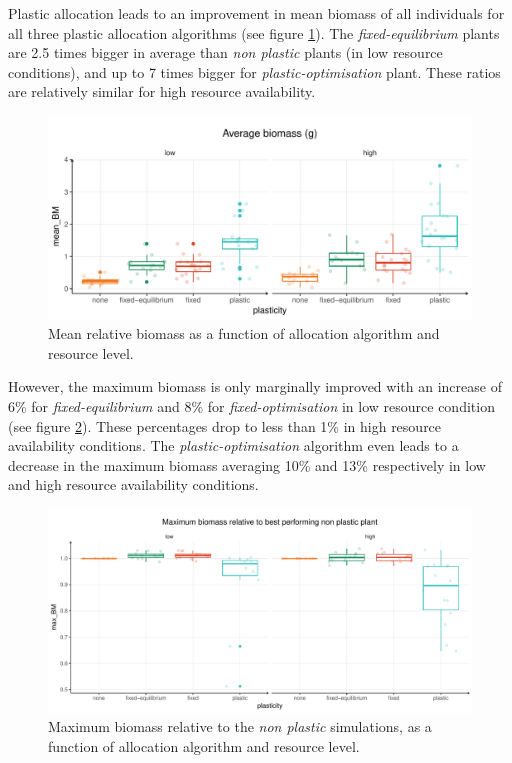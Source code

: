 Plastic allocation leads to an improvement in mean biomass of all individuals for all three plastic allocation algorithms (see figure \ref{fig:mean_BM_pl}). The \textit{fixed-equilibrium} plants are 2.5 times bigger in average than \textit{non plastic} plants (in low resource conditions), and up to 7 times bigger for \textit{plastic-optimisation} plant. These ratios are relatively similar for high resource availability. 

\begin{figure}\label{fig:mean_BM_pl}
\includegraphics[width = \textwidth]{./2_PP/Figures/Landscape/plot_BM_allocation.pdf}
\caption{Mean relative biomass as a function of allocation algorithm and resource level.}
\end{figure}

However, the maximum biomass is only marginally improved with an increase of 6\% for \textit{fixed-equilibrium} and 8\% for \textit{fixed-optimisation} in low resource condition (see figure \ref{fig:max_BM_pl}). These percentages drop to less than 1\% in high resource availability conditions. The \textit{plastic-optimisation} algorithm even leads to a decrease in the maximum biomass averaging 10\% and 13\% respectively in low and high resource availability conditions.

\begin{figure}\label{fig:max_BM_pl}
\includegraphics[width = \textwidth]{./2_PP/Figures/Landscape/plot_maxBM_allocation.pdf}
\caption{Maximum biomass relative to the \textit{non plastic} simulations, as a function of allocation algorithm and resource level.}
\end{figure}

